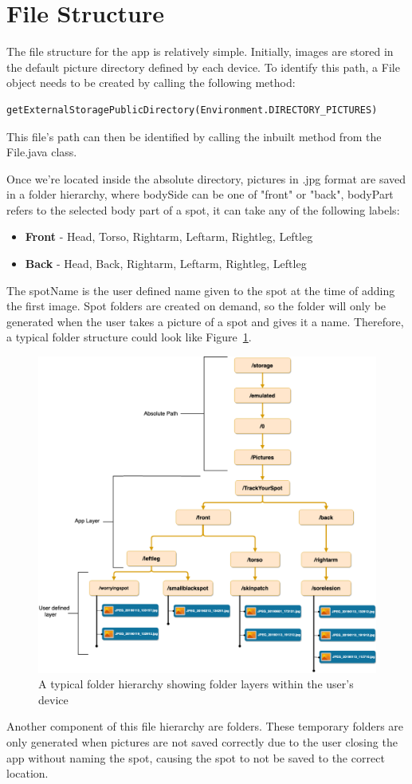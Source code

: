 \section{File Structure} \label{sec:filestructure}
The file structure for the app is relatively simple. Initially, images are stored in the default picture directory defined by each device. To identify this path, a File object needs to be created by calling the following method: \begin{verbatim}
getExternalStoragePublicDirectory(Environment.DIRECTORY_PICTURES)
\end{verbatim}
This file's path can then be identified by calling the inbuilt  method from the File.java class. 

\par Once we're located inside the absolute directory, pictures in .jpg format are saved in a 
folder hierarchy, where bodySide can be one of "front" or "back", bodyPart refers to the selected body part of a spot, it can take any of the following labels:
\begin{itemize}
    \item \textbf{Front} - Head, Torso, Rightarm, Leftarm, Rightleg, Leftleg
    \item \textbf{Back} - Head, Back, Rightarm, Leftarm, Rightleg, Leftleg
\end{itemize}
The spotName is the user defined name given to the spot at the time of adding the first image. Spot folders are created on demand, so the  folder will only be generated when the user takes a picture of a spot and gives it a name. Therefore, a typical folder structure could look like Figure~\ref{fig:filestructure.png}.
\begin{figure}
    \includegraphics[width=1.2\textwidth, center]{figures/filestructure.png}
    \caption{A typical folder hierarchy showing folder layers within the user's device}
    \label{fig:filestructure.png}
\end{figure}
\par Another component of this file hierarchy are  folders. These temporary folders are only generated when pictures are not saved correctly due to the user closing the app without naming the spot, causing the spot to not be saved to the correct location.